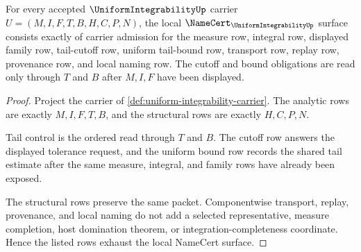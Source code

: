 \begin{theorem}
\label{thm:uniform-integrability-namecert-obligations}
For every accepted $\UniformIntegrabilityUp$ carrier $U=(M,I,F,T,B,H,C,P,N)$, the local $\NameCert_{\UniformIntegrabilityUp}$ surface consists exactly of carrier admission for the measure row, integral row, displayed family row, tail-cutoff row, uniform tail-bound row, transport row, replay row, provenance row, and local naming row. The cutoff and bound obligations are read only through $T$ and $B$ after $M,I,F$ have been displayed.
\end{theorem}
\begin{proof}
Project the carrier of \autoref{def:uniform-integrability-carrier}. The analytic rows are exactly $M,I,F,T,B$, and the structural rows are exactly $H,C,P,N$.

Tail control is the ordered read through $T$ and $B$. The cutoff row answers the displayed tolerance request, and the uniform bound row records the shared tail estimate after the same measure, integral, and family rows have already been exposed.

The structural rows preserve the same packet. Componentwise transport, replay, provenance, and local naming do not add a selected representative, measure completion, host domination theorem, or integration-completeness coordinate. Hence the listed rows exhaust the local NameCert surface.
\end{proof}

